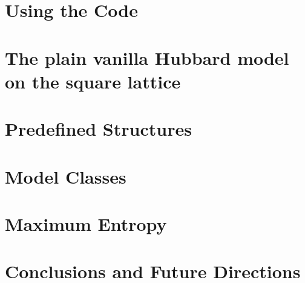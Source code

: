 \documentclass[submission, PhysCodeb]{SciPost}
\begin{document}
\section{Using the Code}\label{sec:running}

\section{The plain vanilla Hubbard model on the square lattice} \label{sec:vanilla}

\section{Predefined Structures}\label{sec:predefined}

\section{Model Classes}\label{sec:model_classes}

\section{Maximum Entropy}\label{sec:maxent}

\section{Conclusions and Future Directions}\label{sec:con}


\begin{appendix}



\end{appendix}

\printindex

\nolinenumbers
\end{document}
